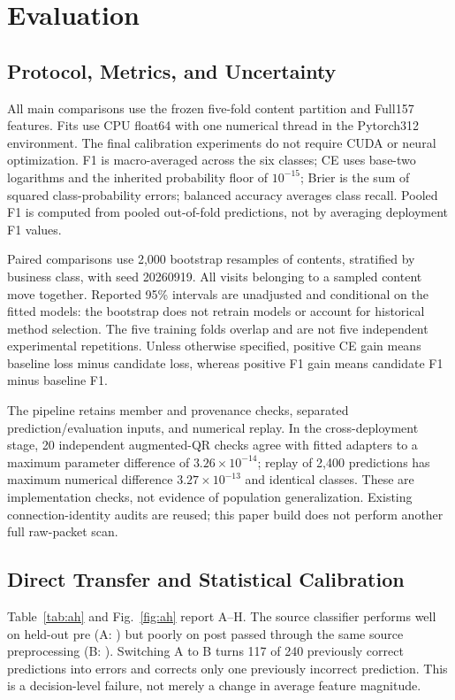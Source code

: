 \section{Evaluation}
\subsection{Protocol, Metrics, and Uncertainty}
All main comparisons use the frozen five-fold content partition and Full157 features. Fits use CPU float64 with one numerical thread in the Pytorch312 environment. The final calibration experiments do not require CUDA or neural optimization. F1 is macro-averaged across the six classes; CE uses base-two logarithms and the inherited probability floor of $10^{-15}$; Brier is the sum of squared class-probability errors; balanced accuracy averages class recall. Pooled F1 is computed from pooled out-of-fold predictions, not by averaging deployment F1 values.

Paired comparisons use 2,000 bootstrap resamples of contents, stratified by business class, with seed 20260919. All visits belonging to a sampled content move together. Reported 95\% intervals are unadjusted and conditional on the fitted models: the bootstrap does not retrain models or account for historical method selection. The five training folds overlap and are not five independent experimental repetitions. Unless otherwise specified, positive CE gain means baseline loss minus candidate loss, whereas positive F1 gain means candidate F1 minus baseline F1.

The pipeline retains member and provenance checks, separated prediction/evaluation inputs, and numerical replay. In the cross-deployment stage, 20 independent augmented-QR checks agree with fitted adapters to a maximum parameter difference of $3.26\times10^{-14}$; replay of 2,400 predictions has maximum numerical difference $3.27\times10^{-13}$ and identical classes. These are implementation checks, not evidence of population generalization. Existing connection-identity audits are reused; this paper build does not perform another full raw-packet scan.

\subsection{Direct Transfer and Statistical Calibration}
Table~\ref{tab:ah} and Fig.~\ref{fig:ah} report A--H. The source classifier performs well on held-out pre (A: \FOneA{}) but poorly on post passed through the same source preprocessing (B: \FOneB{}). Switching A to B turns 117 of 240 previously correct predictions into errors and corrects only one previously incorrect prediction. This is a decision-level failure, not merely a change in average feature magnitude.


